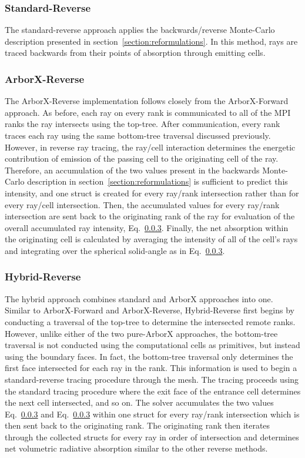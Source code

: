 \subsubsection{Standard-Reverse}
The standard-reverse approach applies the backwards/reverse Monte-Carlo description presented in section~\ref{section:reformulations}. In this method, rays are traced backwards from their points of absorption through emitting cells.

\subsubsection{ArborX-Reverse}
The ArborX-Reverse implementation follows closely from the ArborX-Forward approach. As before, each ray on every rank is communicated to all of the MPI ranks the ray intersects using the top-tree. After communication, every rank traces each ray using the same bottom-tree traversal discussed previously.
However, in reverse ray tracing, the ray/cell interaction determines the energetic contribution of emission of the passing cell to the originating cell of the ray. Therefore, an accumulation of the two values present in the backwards Monte-Carlo description in section~\ref{section:reformulations} is sufficient to predict this intensity, and one struct is created for every ray/rank intersection rather than for every ray/cell intersection. Then, the accumulated values for every ray/rank intersection are sent back to the originating rank of the ray for evaluation of the overall accumulated ray intensity, Eq.~\ref{}.
Finally, the net absorption within the originating cell is calculated by averaging the intensity of all of the cell's rays and integrating over the spherical solid-angle as in Eq.~\ref{}.

\subsubsection{Hybrid-Reverse}
The hybrid approach combines standard and ArborX approaches into one. Similar to ArborX-Forward and ArborX-Reverse, Hybrid-Reverse first begins by conducting a traversal of the top-tree to determine the intersected remote ranks. However, unlike either of the two pure-ArborX approaches, the bottom-tree traversal is not conducted using the computational cells as primitives, but instead using the boundary faces. 
In fact, the bottom-tree traversal only determines the first face intersected for each ray in the rank. This information is used to begin a standard-reverse tracing procedure through the mesh. The tracing proceeds using the standard tracing procedure where the exit face of the entrance cell determines the next cell intersected, and so on. The solver accumulates the two values Eq.~\ref{} and Eq.~\ref{} within one struct for every ray/rank intersection which is then sent back to the originating rank.
The originating rank then iterates through the collected structs for every ray in order of intersection and determines net volumetric radiative absorption similar to the other reverse methods.

